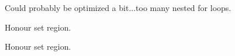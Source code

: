 \begin{DoxyRefList}
\item[\label{todo__todo000012}%
\hypertarget{todo__todo000012}{}%
Global \hyperlink{group__ilu__filter_ga609a51f490472174047feaf70918e3ac}{ilu\+Pixelize} (I\+Luint Pix\+Size)]Could probably be optimized a bit...too many nested for loops.


\item[\label{todo__todo000013}%
\hypertarget{todo__todo000013}{}%
Global \hyperlink{group__ilu__filter_gac3447a57b322058f1c2e49faa724e4f0}{ilu\+Replace\+Colour} (I\+Lubyte Red, I\+Lubyte Green, I\+Lubyte Blue, I\+Lfloat Tolerance)]Honour set region.  
\item[\label{todo__todo000014}%
\hypertarget{todo__todo000014}{}%
Global \hyperlink{group__ilu__filter_gab8e36ca96f5766b4c9fd6727d688405a}{ilu\+Sharpen} (I\+Lfloat Factor, I\+Luint Iter)]Honour set region. 
\end{DoxyRefList}